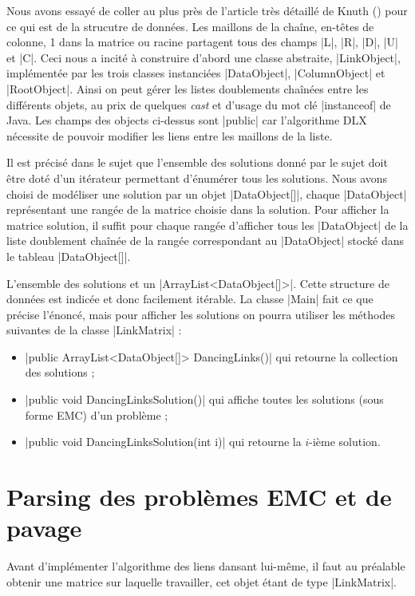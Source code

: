 \documentclass[11pt,french,a4paper]{article}
\begin{document}
Nous avons essayé de coller au plus près de l'article très détaillé de Knuth (\cite{Knuth}) pour ce qui est de la strucutre de données. Les maillons de la chaîne, en-têtes de colonne, 1 dans la matrice ou racine partagent tous des champs |L|, |R|, |D|, |U| et |C|. Ceci nous a incité à construire d'abord une classe abstraite, |LinkObject|, implémentée par les trois classes instanciées |DataObject|, |ColumnObject| et |RootObject|. Ainsi on peut gérer les listes doublements chaînées entre les différents objets, au prix de quelques \emph{cast} et d'usage du mot clé |instanceof| de Java. Les champs des objects ci-dessus sont |public| car l'algorithme DLX nécessite de pouvoir modifier les liens entre les maillons de la liste.

Il est précisé dans le sujet que l'ensemble des solutions donné par le sujet doit être doté d'un itérateur permettant d'énumérer tous les solutions. Nous avons choisi de modéliser une solution par un objet |DataObject[]|, chaque |DataObject| représentant une rangée de la matrice choisie dans la solution. Pour afficher la matrice solution, il suffit pour chaque rangée d'afficher tous les |DataObject| de la liste doublement chaînée de la rangée correspondant au |DataObject| stocké dans le tableau |DataObject[]|.

L'ensemble des solutions et un |ArrayList<DataObject[]>|. Cette structure de données est indicée et donc facilement itérable. La classe |Main| fait ce que précise l'énoncé, mais pour afficher les solutions on pourra utiliser les méthodes suivantes de la classe |LinkMatrix| :
\begin{itemize}
	\item |public ArrayList<DataObject[]> DancingLinks()| qui retourne la collection des solutions ;
	\item |public void DancingLinksSolution()| qui affiche toutes les solutions (sous forme EMC) d'un problème ;
	\item |public void DancingLinksSolution(int i)| qui retourne la $i$-ième solution.
\end{itemize}



\section{Parsing des problèmes EMC et de pavage}

Avant d'implémenter l'algorithme des liens dansant lui-même, il faut au préalable obtenir une matrice sur laquelle travailler, cet objet étant de type |LinkMatrix|. 
\end{document}
